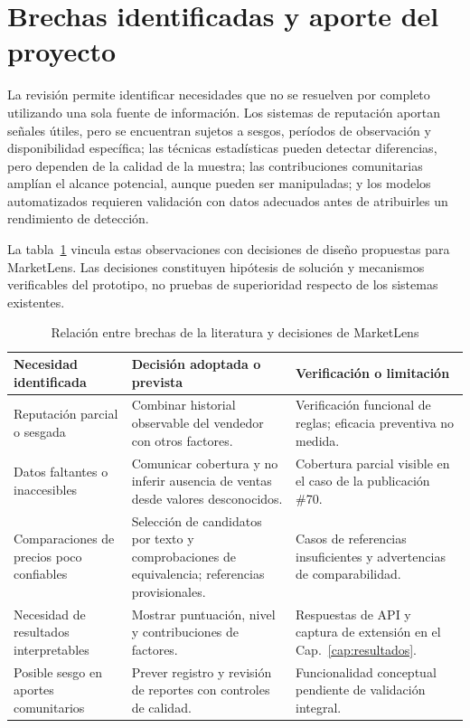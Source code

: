 \section{Brechas identificadas y aporte del proyecto}\label{sec:ml-brechas}

La revisión permite identificar necesidades que no se resuelven por completo utilizando una sola fuente de información. Los sistemas de reputación aportan señales útiles, pero se encuentran sujetos a sesgos, períodos de observación y disponibilidad específica; las técnicas estadísticas pueden detectar diferencias, pero dependen de la calidad de la muestra; las contribuciones comunitarias amplían el alcance potencial, aunque pueden ser manipuladas; y los modelos automatizados requieren validación con datos adecuados antes de atribuirles un rendimiento de detección.

La tabla~\ref{tab:ml-brechas} vincula estas observaciones con decisiones de diseño propuestas para MarketLens. Las decisiones constituyen hipótesis de solución y mecanismos verificables del prototipo, no pruebas de superioridad respecto de los sistemas existentes.

\begin{table}[htbp]
    \centering
    \caption{Relación entre brechas de la literatura y decisiones de MarketLens}
    \label{tab:ml-brechas}
    \footnotesize
    \begin{tabularx}{\textwidth}{@{}p{}X X@{}}
        \toprule
        \textbf{Necesidad identificada} & \textbf{Decisión adoptada o prevista} & \textbf{Verificación o limitación} \\
        \midrule
        Reputación parcial o sesgada & Combinar historial observable del vendedor con otros factores. & Verificación funcional de reglas; eficacia preventiva no medida. \\
        \addlinespace[2pt]
        Datos faltantes o inaccesibles & Comunicar cobertura y no inferir ausencia de ventas desde valores desconocidos. & Cobertura parcial visible en el caso de la publicación \#70. \\
        \addlinespace[2pt]
        Comparaciones de precios poco confiables & Selección de candidatos por texto y comprobaciones de equivalencia; referencias provisionales. & Casos de referencias insuficientes y advertencias de comparabilidad. \\
        \addlinespace[2pt]
        Necesidad de resultados interpretables & Mostrar puntuación, nivel y contribuciones de factores. & Respuestas de API y captura de extensión en el Cap.~\ref{cap:resultados}. \\
        \addlinespace[2pt]
        Posible sesgo en aportes comunitarios & Prever registro y revisión de reportes con controles de calidad. & Funcionalidad conceptual pendiente de validación integral. \\
        \bottomrule
    \end{tabularx}
\end{table}


